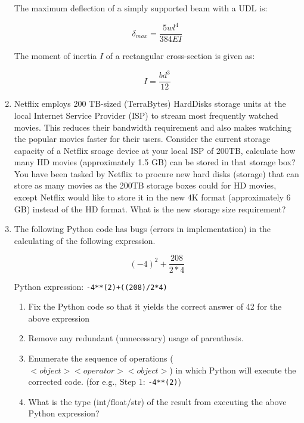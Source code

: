 \documentclass[a4paper,12pt]{article}
\begin{document}
\begin{enumerate}
	The maximum deflection of a simply supported beam with a UDL is:
	
	\begin{equation*}
		\delta_{max} = \frac{5wl^4}{384EI}
	\end{equation*}
	
	The moment of inertia $I$ of a rectangular cross-section is given as:
	
	\begin{equation}
		I = \frac{b d^3}{12}
	\end{equation}
	
	\item Netflix employs 200 TB-sized (TerraBytes) HardDisks storage units at the local Internet Service Provider (ISP) to stream most frequently watched movies. This reduces their bandwidth requirement and also makes watching the popular movies faster for their users. Consider the current storage capacity of a Netflix sroage device at your local ISP of 200TB, calculate how many HD movies (approximately 1.5 GB) can be stored in that storage box? You have been tasked by Netflix to procure new hard disks (storage) that can store as many movies as the 200TB storage boxes could for HD movies, except Netflix would like to store it in the new 4K format (approximately 6 GB) instead of the HD format. What is the new storage size requirement?
	
	\item The following Python code has bugs (errors in implementation) in the calculating of the following expression.
		
	\begin{equation*}
	(-4)^2 + \frac{208}{2 * 4}
	\end{equation*}

	Python expression: \verb|-4**(2)+((208)/2*4)|
	
	\begin{enumerate}
		\item Fix the Python code so that it yields the correct answer of 42 for the above expression
		
		\item Remove any redundant (unnecessary) usage of parenthesis. 
		
		\item Enumerate the sequence of operations ($<object><operator><object>$) in which Python will execute the corrected code. (for e.g., Step 1: \verb|-4**(2)|)
		
		\item What is the type (int/float/str) of the result from executing the above Python expression?
	\end{enumerate}
\end{enumerate}
\end{document}
